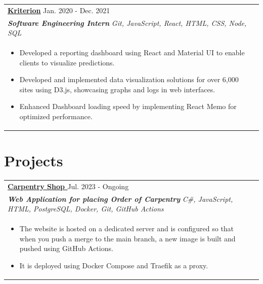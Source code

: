 \documentclass[a4paper,8pt]{article}
\begin{document}
\begin{tabularx}{\linewidth}{ @{}l r@{} }
\color[HTML]{1C033C} \textbf{\uline{\href{https://kriterion.ai}{Kriterion}}} \hfill \color[HTML]{371e77} Jan. 2020 - Dec. 2021 \\[4pt]
\color[HTML]{371e77}\textbf{\textit{Software Engineering Intern}} \hfill \color[HTML]{4B28A4} \textit{Git, JavaScript, React, HTML, CSS, Node, SQL} \\[5pt]
\begin{minipage}[t]{\linewidth}
    \begin{itemize}[nosep,after=\strut, leftmargin=2em, itemsep=2pt]
        \item Developed a reporting dashboard using React and Material UI to enable clients to visualize predictions.
        \item Developed and implemented data visualization solutions for over 6,000 sites using D3.js, showcasing graphs and logs in web interfaces.
        \item Enhanced Dashboard loading speed by implementing React Memo for optimized performance.
    \end{itemize}
    \end{minipage}
\end{tabularx}

\section{Projects}
\begin{tabularx}{\linewidth}{ @{}l r@{} }
\color[HTML]{1C033C} \textbf{\uline{\href{https://carpentry.simanga.dev/}{Carpentry Shop }}} \hfill \color[HTML]{371e77} Jul. 2023 - Ongoing \\[4pt]
\color[HTML]{371e77}\textbf{\textit{Web Application for placing Order of Carpentry}} \hfill \color[HTML]{4B28A4} \textit{C\#, JavaScript, HTML, PostgreSQL, Docker, Git, GitHub Actions} \\[5pt]
\begin{minipage}[t]{\linewidth}
    \begin{itemize}[nosep,after=\strut, leftmargin=2em, itemsep=2pt]
        \item The website is hosted on a dedicated server and is configured so that when you push a merge to the main branch, a new image is built and pushed using GitHub Actions.
        \item It is deployed using Docker Compose and Traefik as a proxy.
    \end{itemize}
    \end{minipage}
\end{tabularx}
\end{document}
